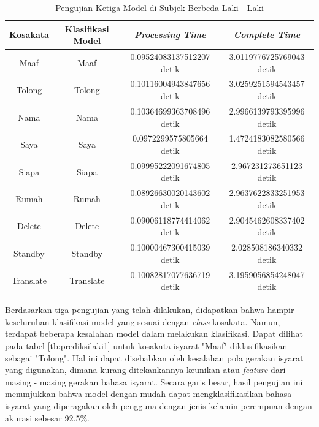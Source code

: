 \begin{longtable}{|c|c|c|c|}
  \caption{Pengujian Ketiga Model di Subjek Berbeda Laki - Laki}
  \label{tb:prediksilaki3}                                   \\
  \hline
  \rowcolor[HTML]{C0C0C0}
  \textbf{Kosakata} & \textbf{Klasifikasi Model} & \textbf{\emph{Processing Time}} & \textbf{\emph{Complete Time}}\\
  \hline
  Maaf              & Maaf                          & 0.09524083137512207 detik                           & 3.0119776725769043 detik                                  \\
  Tolong            & Tolong                        & 0.10116004943847656 detik                           & 3.0259251594543457 detik                                 \\
  Nama              & Nama                          & 0.10364699363708496 detik                           & 2.9966139793395996 detik                                 \\
  Saya              & Saya                          & 0.0972299575805664 detik                            & 1.4724183082580566 detik                                 \\
  Siapa             & Siapa                         & 0.09995222091674805 detik                           & 2.967231273651123 detik                                \\
  Rumah             & Rumah                         & 0.08926630020143602 detik                           & 2.9637622833251953 detik                                 \\
  Delete            & Delete                        & 0.09006118774414062 detik                           & 2.9045462608337402 detik                                 \\
  Standby           & Standby                       & 0.10000467300415039 detik                           & 2.028508186340332 detik                                \\
  Translate         & Translate                     & 0.10082817077636719 detik                           & 3.1959056854248047 detik                                 \\
  \hline
\end{longtable}

Berdasarkan tiga pengujian yang telah dilakukan, didapatkan bahwa hampir keseluruhan klasifikasi model yang sesuai dengan \emph{class} kosakata. Namun, terdapat beberapa kesalahan model dalam melakukan klasifikasi. Dapat dilihat pada tabel \ref{tb:prediksilaki1} untuk kosakata isyarat "Maaf" diklasifikasikan sebagai "Tolong". Hal ini dapat disebabkan oleh kesalahan pola gerakan isyarat yang digunakan, dimana kurang ditekankannya keunikan atau \emph{feature} dari masing - masing gerakan bahasa isyarat.  Secara garis besar, hasil pengujian ini menunjukkan bahwa model dengan mudah dapat mengklasifikasikan bahasa isyarat yang diperagakan oleh pengguna dengan jenis kelamin perempuan dengan akurasi sebesar 92.5\%. 

